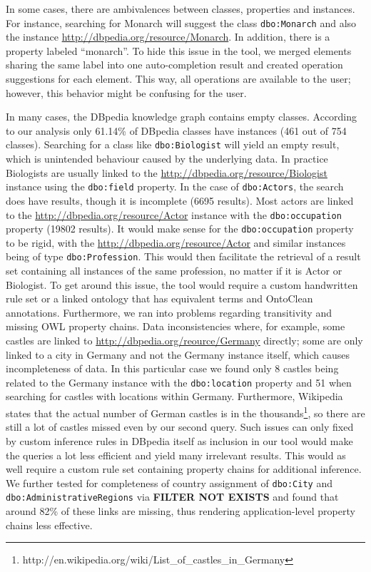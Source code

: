 \documentclass{sig-alternate}
\begin{document}
In some cases, there are ambivalences between classes, properties and instances. For instance, searching for Monarch will suggest the class \Verb+dbo:Monarch+ and also the instance \url{http://dbpedia.org/resource/Monarch}. In addition, there is a property labeled ``monarch''. To hide this issue in the tool, we merged elements sharing the same label into one auto-completion result and created operation suggestions for each element. This way, all operations are available to the user; however, this behavior might be confusing for the user.

In many cases, the DBpedia knowledge graph contains empty classes. According to our analysis only 61.14\% of DBpedia classes have instances (461 out of 754 classes). Searching for a class like \Verb+dbo:Biologist+ will yield an empty result, which is unintended behaviour caused by the underlying data. In practice Biologists are usually linked to the \url{http://dbpedia.org/resource/Biologist} instance using the \Verb+dbo:field+ property. In the case of \Verb+dbo:Actors+, the search does have results, though it is incomplete (6695 results). Most actors are linked to the \url{http://dbpedia.org/resource/Actor} instance with the \Verb+dbo:occupation+ property (19802 results). It would make sense for the \Verb+dbo:occupation+ property to be rigid, with the \url{http://dbpedia.org/resource/Actor} and similar instances being of type \Verb+dbo:Profession+. This would then facilitate the retrieval of a result set containing all instances of the same profession, no matter if it is Actor or Biologist. To get around this issue, the tool would require a custom handwritten rule set or a linked ontology that has equivalent terms and OntoClean annotations. Furthermore, we ran into problems regarding transitivity and missing OWL property chains. Data inconsistencies where, for example, some castles are linked to \url{http://dbpedia.org/reource/Germany} directly; some are only linked to a city in Germany and not the Germany instance itself, which causes incompleteness of data. In this particular case we found only 8 castles being related to the Germany instance with the \Verb+dbo:location+ property and 51 when searching for castles with locations within Germany. Furthermore, Wikipedia states that the actual number of German castles is in the thousands\footnote{ http://en.wikipedia.org/wiki/List\_of\_castles\_in\_Germany}, so there are still a lot of castles missed even by our second query. Such issues can only ﬁxed by custom inference rules in DBpedia itself as inclusion in our tool would make the queries a lot less eﬃcient and yield many irrelevant results. This would as well require a custom rule set containing property chains for additional inference. We further tested for completeness of country assignment of \Verb+dbo:City+ and \Verb+dbo:AdministrativeRegions+ via {\bf FILTER NOT EXISTS} and found that around 82\% of these links are missing, thus rendering application-level property chains less eﬀective.
\end{document}
